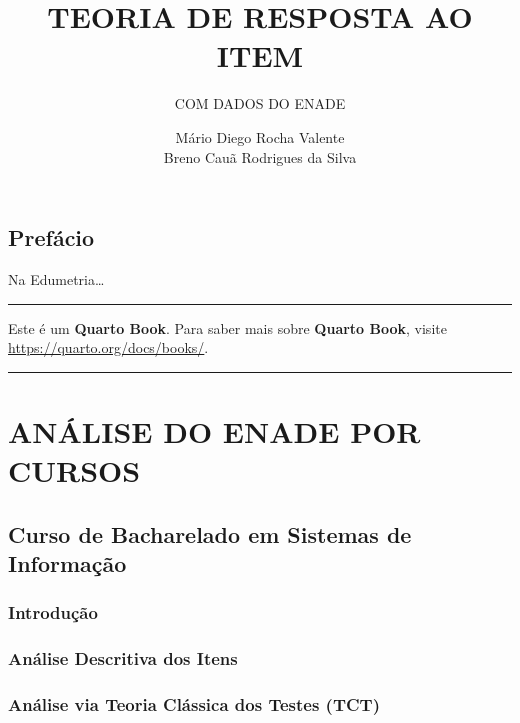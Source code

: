\documentclass[
  portuguese,
  11pt,
  a4paper,
  DIV=11,
  numbers=noendperiod]{scrreprt}
\title{TEORIA DE RESPOSTA AO ITEM}
\subtitle{COM DADOS DO ENADE}
\author{Mário Diego Rocha Valente \\ Breno Cauã Rodrigues da Silva}
\date{}
\renewcommand*\contentsname{Índice}
\newcommand\contentsname{Índice}
\begin{document}
\maketitle

\renewcommand*\contentsname{Índice}
{
\hypersetup{linkcolor=}
\setcounter{tocdepth}{2}
\tableofcontents
}


\chapter*{Prefácio}\label{prefuxe1cio}


Na Edumetria\ldots{}

\begin{center}\hrule\end{center}

Este é um \textbf{Quarto Book}. Para saber mais sobre \textbf{Quarto
Book}, visite \url{https://quarto.org/docs/books/}.

\begin{center}\hrule\end{center}

\part{ANÁLISE DO ENADE POR CURSOS}


\chapter{Curso de Bacharelado em Sistemas de
Informação}\label{curso-de-bacharelado-em-sistemas-de-informauxe7uxe3o}

\section{Introdução}\label{introduuxe7uxe3o}

\section{Análise Descritiva dos
Itens}\label{anuxe1lise-descritiva-dos-itens}

\section{Análise via Teoria Clássica dos Testes
(TCT)}\label{anuxe1lise-via-teoria-cluxe1ssica-dos-testes-tct}
\end{document}
